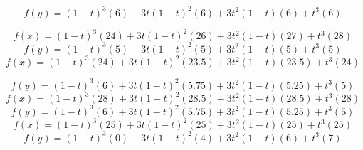 \documentclass[11pt]{article}
\begin{document}
\begin{enumerate}
\begin{equation}
f(y) = (1-t)^{3}\left(6\right)+3t(1-t)^{2}\left(6\right)+3t^{2}(1-t)\left(6\right)+t^{3}\left(6\right)
\end{equation}

\begin{equation}
f(x) = (1-t)^{3}\left(24\right)+3t(1-t)^{2}\left(26\right)+3t^{2}(1-t)\left(27\right)+t^{3}\left(28\right)
\end{equation}
\begin{equation}
f(y) = (1-t)^{3}\left(5\right)+3t(1-t)^{2}\left(5\right)+3t^{2}(1-t)\left(5\right)+t^{3}\left(5\right)
\end{equation}
\begin{equation}
f(x) = (1-t)^{3}\left(24\right)+3t(1-t)^{2}\left(23.5\right)+3t^{2}(1-t)\left(23.5\right)+t^{3}\left(24\right)
\end{equation}

\begin{equation}
f(y) = (1-t)^{3}\left(6\right)+3t(1-t)^{2}\left(5.75\right)+3t^{2}(1-t)\left(5.25\right)+t^{3}\left(5\right)
\end{equation}
\begin{equation}
f(x) = (1-t)^{3}\left(28\right)+3t(1-t)^{2}\left(28.5\right)+3t^{2}(1-t)\left(28.5\right)+t^{3}\left(28\right)
\end{equation}
\begin{equation}
f(y) = (1-t)^{3}\left(6\right)+3t(1-t)^{2}\left(5.75\right)+3t^{2}(1-t)\left(5.25\right)+t^{3}\left(5\right)
\end{equation}
\begin{equation}
f(x) = (1-t)^{3}\left(25\right)+3t(1-t)^{2}\left(25\right)+3t^{2}(1-t)\left(25\right)+t^{3}\left(25\right)
\end{equation}
\begin{equation}
f(y) = (1-t)^{3}\left(0\right)+3t(1-t)^{2}\left(4\right)+3t^{2}(1-t)\left(6\right)+t^{3}\left(7\right)
\end{equation}


\end{enumerate}
\end{document}
